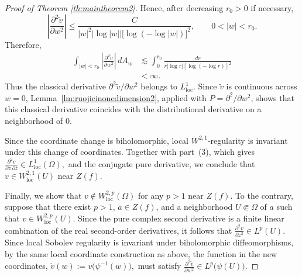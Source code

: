 \documentclass[12pt,twoside]{amsart}
\numberwithin{equation}{section}
\numberwithin{definition}{section} %
\begin{document}
\begin{proof}[Proof of Theorem \ref{th:maintheorem2}]
Hence, after decreasing $r_0>0$ if necessary,
\[
\left|
\frac{\partial^2 \widetilde v}{\partial w^2}
\right|
\le
\frac{C}
{|w|^2|\log |w||
 \bigl[\log(-\log |w|)\bigr]^2},
\qquad 0<|w|<r_0.
\]
Therefore,
\[
\begin{aligned}
\int_{|w|<r_0}
\left|
\frac{\partial^2 \widetilde v}{\partial w^2}
\right|\,dA_w
&\lesssim
\int_0^{r_0}
\frac{dr}
{r|\log r|[\log(-\log r)]^2} \\
&<\infty.
\end{aligned}
\]
Thus the classical derivative
$\partial^2\widetilde v/\partial w^2$ belongs to
$L^1_{\mathrm{loc}}$. Since $\widetilde v$ is continuous across $w=0$,
Lemma~\ref{lm:ruojieinonedimension2}, applied with
$P=\partial^2/\partial w^2$, shows that this classical derivative
coincides with the distributional derivative on a neighborhood of $0$.

Since the coordinate change is biholomorphic, local $W^{2,1}$-regularity
is invariant under this change of coordinates. Together with part~(3),
which gives
$\frac{\partial^2 v}{\partial z\,\partial\bar z} \in L^1_{\mathrm{loc}}(\Omega),$
and the conjugate pure derivative, we conclude that
$v\in W^{2,1}_{\mathrm{loc}}(U)$ near $Z(f)$.

Finally, we show that
$
v\notin W_{\mathrm{loc}}^{2,p}(\Omega)$ for any $ p>1$ near \(Z(f)\). 
To the contrary, suppose that there exist $p > 1$, $a \in Z(f)$, and a neighborhood $U \Subset \Omega$ of $a$ such that
$
v \in W^{2,p}_{\mathrm{loc}}(U).
$
Since the pure complex second derivative is a finite linear combination of the real second-order derivatives, it follows that
$
\frac{\partial^2 v}{\partial z^2}\in L^p(U).
$
Since local Sobolev regularity is invariant under biholomorphic diffeomorphisms, by the same local coordinate construction as above, the function in the new coordinates,
$
\widetilde v(w):=v\bigl(\psi^{-1}(w)\bigr),
$
must satisfy
$\frac{\partial^2 \widetilde{v}}{\partial w^2}
\in L_{}^p\bigl(\psi(U)\bigr).
$


\end{proof}
\end{document}
